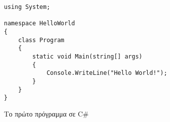 \begin{listing}[htbp]
\begin{verbatim}
using System;

namespace HelloWorld
{
    class Program
    {
        static void Main(string[] args)
        {
            Console.WriteLine("Hello World!");
        }
    }
}
\end{verbatim}
\caption{Το πρώτο πρόγραμμα σε C\#}
\label{HelloWorld}
\end{listing}